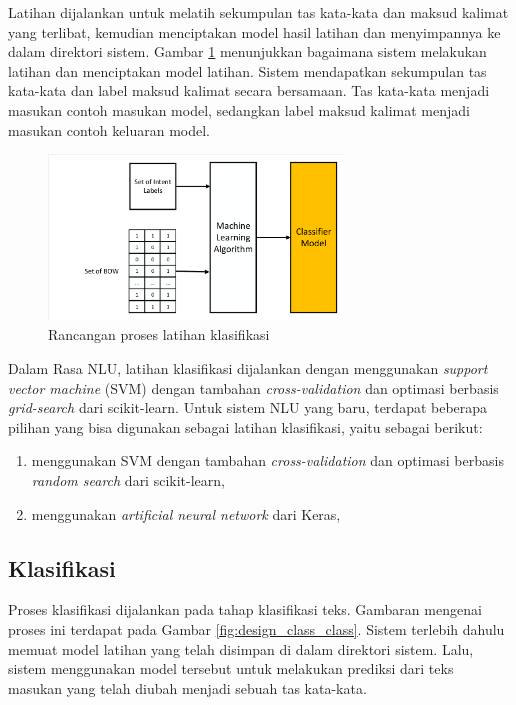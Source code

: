 Latihan dijalankan untuk melatih sekumpulan tas kata-kata dan maksud kalimat yang terlibat, kemudian menciptakan model hasil latihan dan menyimpannya ke dalam direktori sistem. Gambar \ref{fig:design_train_class} menunjukkan bagaimana sistem melakukan latihan dan menciptakan model latihan. Sistem mendapatkan sekumpulan tas kata-kata dan label maksud kalimat secara bersamaan. Tas kata-kata menjadi masukan contoh masukan model, sedangkan label maksud kalimat menjadi masukan contoh keluaran model.

\begin{figure}[H]
	\centering
	\includegraphics[width=0.7\textwidth, trim=3 3 3 3, clip]{resources/4-design_train_class.pdf}
	\caption{Rancangan proses latihan klasifikasi}
	\label{fig:design_train_class}
\end{figure}

Dalam Rasa NLU, latihan klasifikasi dijalankan dengan menggunakan \textit{support vector machine} (SVM) dengan tambahan \textit{cross-validation} dan optimasi berbasis \textit{grid-search} dari scikit-learn. Untuk sistem NLU yang baru, terdapat beberapa pilihan yang bisa digunakan sebagai latihan klasifikasi, yaitu sebagai berikut:

\begin{enumerate}
	\item menggunakan SVM dengan tambahan \textit{cross-validation} dan optimasi berbasis \textit{random search} dari scikit-learn,
	\item menggunakan \textit{artificial neural network} dari Keras,
\end{enumerate}

\subsection{Klasifikasi}

Proses klasifikasi dijalankan pada tahap klasifikasi teks. Gambaran mengenai proses ini terdapat pada Gambar \ref{fig:design_class_class}. Sistem terlebih dahulu memuat model latihan yang telah disimpan di dalam direktori sistem. Lalu, sistem menggunakan model tersebut untuk melakukan prediksi dari teks masukan yang telah diubah menjadi sebuah tas kata-kata.

